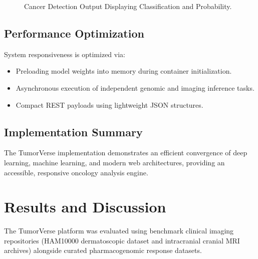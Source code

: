 \documentclass[conference]{IEEEtran}
\begin{document}
\begin{figure}[htbp]
\centering
{}
\caption{Cancer Detection Output Displaying Classification and Probability.}
\label{fig:detection_ui}
\end{figure}

\subsection{Performance Optimization}
System responsiveness is optimized via:
\begin{itemize}
    \item Preloading model weights into memory during container initialization.
    \item Asynchronous execution of independent genomic and imaging inference tasks.
    \item Compact REST payloads using lightweight JSON structures.
\end{itemize}

\subsection{Implementation Summary}
The TumorVerse implementation demonstrates an efficient convergence of deep learning, machine learning, and modern web architectures, providing an accessible, responsive oncology analysis engine.

\section{Results and Discussion}
The TumorVerse platform was evaluated using benchmark clinical imaging repositories (HAM10000 dermatoscopic dataset and intracranial cranial MRI archives) alongside curated pharmacogenomic response datasets.
\end{document}
